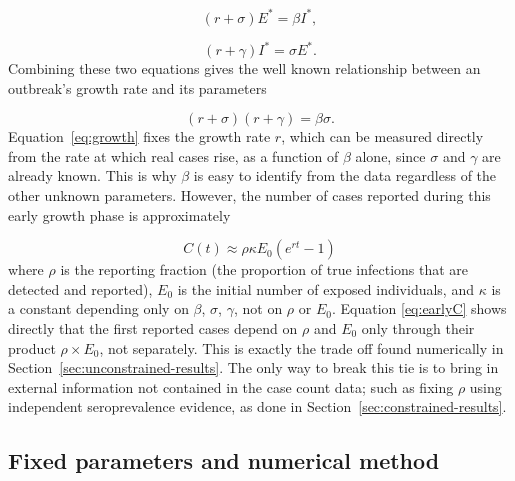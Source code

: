 \documentclass[journal]{IEEEtran}
\begin{document}
\begin{equation}
(r+\sigma)E^\ast = \beta I^\ast, 
\end{equation}

\begin{equation}
(r+\gamma)I^\ast = \sigma E^\ast.
\end{equation}
Combining these two equations gives the well known relationship between an outbreak's growth rate and its parameters
\cite{wallinga2007}

\begin{equation}
(r+\sigma)(r+\gamma) = \beta \sigma.
\label{eq:growth}
\end{equation}
Equation~\eqref{eq:growth} fixes the growth rate $r$, which can be measured directly from the rate at which real cases rise, as a function of $\beta$ alone, since $\sigma$ and $\gamma$ are already known. This is why $\beta$ is easy to identify from the data regardless of the other unknown parameters. However, the number of cases reported during this early growth phase is approximately

\begin{equation}
C(t) \approx \rho \kappa E_0 \left(e^{rt} - 1\right)
\label{eq:earlyC}
\end{equation}
where $\rho$ is the reporting fraction (the proportion of true infections that are detected and reported), $E_0$ is the initial number of exposed individuals, and $\kappa$ is a constant depending only on $\beta$, $\sigma$, $\gamma$, not on $\rho$ or $E_0$. Equation \eqref{eq:earlyC} shows directly that the first reported cases depend on $\rho$ and $E_0$ only through their product $\rho \times E_0$, not separately. This is exactly the trade off found numerically in Section~\ref{sec:unconstrained-results}. The only way to break this tie is to bring in external information not contained in the case count data; such as fixing $\rho$ using independent seroprevalence evidence, as done in Section~\ref{sec:constrained-results}. 

\subsection{Fixed parameters and numerical method}
\end{document}
